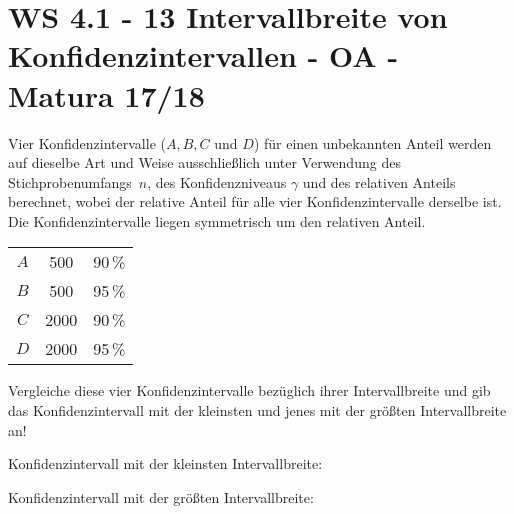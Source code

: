 \section{WS 4.1 - 13 Intervallbreite von Konfidenzintervallen - OA - Matura 17/18}

\begin{beispiel}[WS 4.1]{1} %
Vier Konfidenzintervalle ($A, B, C$ und $D$) für einen unbekannten Anteil werden auf dieselbe Art und Weise ausschließlich unter Verwendung des Stichprobenumfangs $n$, des Konfidenzniveaus $\gamma$ und des relativen Anteils berechnet, wobei der relative Anteil für alle vier Konfidenzintervalle derselbe ist. Die Konfidenzintervalle liegen symmetrisch um den relativen Anteil.

\begin{center}
	\begin{tabular}{|c|c|c|}\hline
	\cellcolor[gray]{0.9}{Konfidenzintervall}&\cellcolor[gray]{0.9}{Stichprobenumfang $n$}&\cellcolor[gray]{0.9}{Konfidenzniveau $\sigma$}\\ \hline
	$A$&500&90\,\%\\ \hline
	$B$&500&95\,\%\\ \hline
	$C$&2000&90\,\%\\ \hline
	$D$&2000&95\,\%\\ \hline
	\end{tabular}
\end{center}

Vergleiche diese vier Konfidenzintervalle bezüglich ihrer Intervallbreite und gib das Konfidenzintervall mit der kleinsten und jenes mit der größten Intervallbreite an!\leer

Konfidenzintervall mit der kleinsten Intervallbreite: \leer

Konfidenzintervall mit der größten Intervallbreite: 
\end{beispiel}